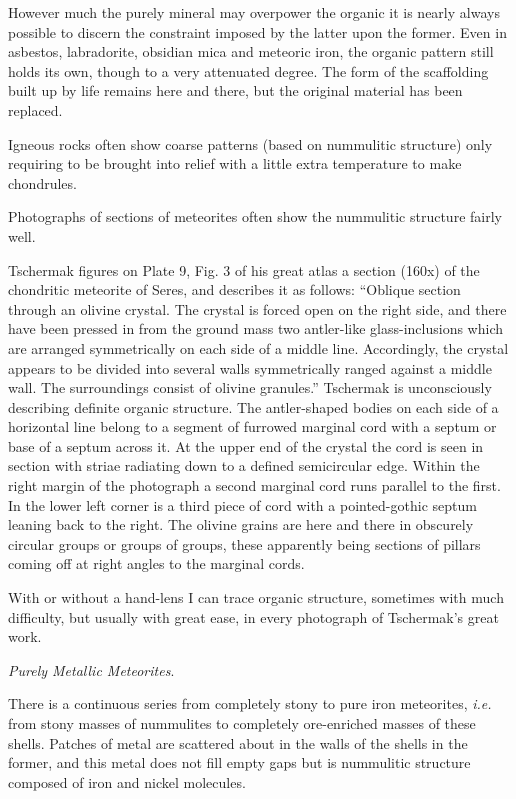 \documentclass[a4paper, 12pt, oneside]{article}
\begin{document}
However much the purely mineral may overpower the organic it is nearly always possible to discern the constraint imposed by the latter upon the former. Even in asbestos, labradorite, obsidian mica and meteoric iron, the organic pattern still holds its own, though to a very attenuated degree. The form of the scaffolding built up by life remains here and there, but the original material has been replaced.

Igneous rocks often show coarse patterns (based on nummulitic structure) only requiring to be brought into relief with a little extra temperature to make chondrules.

Photographs of sections of meteorites often show the nummulitic structure fairly well.

Tschermak figures on Plate 9, Fig. 3 of his great atlas a section (160x) of the chondritic meteorite of Seres, and describes it as follows: ``Oblique section through an olivine crystal. The crystal is forced open on the right side, and there have been pressed in from the ground mass two antler-like glass-inclusions which are arranged symmetrically on each side of a middle line. Accordingly, the crystal appears to be divided into several walls symmetrically ranged against a middle wall. The surroundings consist of olivine granules.'' Tschermak is unconsciously describing definite organic structure. The antler-shaped bodies on each side of a horizontal line belong to a segment of furrowed marginal cord with a septum or base of a septum across it. At the upper end of the crystal the cord is seen in section with striae radiating down to a defined semicircular edge. Within the right margin of the photograph a second marginal cord runs parallel to the first. In the lower left corner is a third piece of cord with a pointed-gothic septum leaning back to the right. The olivine grains are here and there in obscurely circular groups or groups of groups, these apparently being sections of pillars coming off at right angles to the marginal cords.

With or without a hand-lens I can trace organic structure, sometimes with much difficulty, but usually with great ease, in every photograph of Tschermak's great work.

\emph{Purely Metallic Meteorites}.

There is a continuous series from completely stony to pure iron meteorites, \emph{i.e.} from stony masses of nummulites to completely ore-enriched masses of these shells. Patches of metal are scattered about in the walls of the shells in the former, and this metal does not fill empty gaps but is nummulitic structure composed of iron and nickel molecules.
\end{document}
